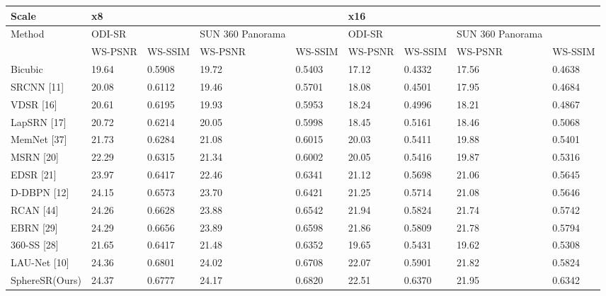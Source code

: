 \begin{tabular}{lllllllll}
\toprule
Scale & x8 &  &  &  & x16 &  &  &  \\
\midrule
Method & ODI-SR &  & SUN 360 Panorama &  & ODI-SR &  & SUN 360 Panorama &  \\
 & WS-PSNR & WS-SSIM & WS-PSNR & WS-SSIM & WS-PSNR & WS-SSIM & WS-PSNR & WS-SSIM \\
Bicubic & 19.64 & 0.5908 & 19.72 & 0.5403 & 17.12 & 0.4332 & 17.56 & 0.4638 \\
SRCNN [11] & 20.08 & 0.6112 & 19.46 & 0.5701 & 18.08 & 0.4501 & 17.95 & 0.4684 \\
VDSR [16] & 20.61 & 0.6195 & 19.93 & 0.5953 & 18.24 & 0.4996 & 18.21 & 0.4867 \\
LapSRN [17] & 20.72 & 0.6214 & 20.05 & 0.5998 & 18.45 & 0.5161 & 18.46 & 0.5068 \\
MemNet [37] & 21.73 & 0.6284 & 21.08 & 0.6015 & 20.03 & 0.5411 & 19.88 & 0.5401 \\
MSRN [20] & 22.29 & 0.6315 & 21.34 & 0.6002 & 20.05 & 0.5416 & 19.87 & 0.5316 \\
EDSR [21] & 23.97 & 0.6417 & 22.46 & 0.6341 & 21.12 & 0.5698 & 21.06 & 0.5645 \\
D-DBPN [12] & 24.15 & 0.6573 & 23.70 & 0.6421 & 21.25 & 0.5714 & 21.08 & 0.5646 \\
RCAN [44] & 24.26 & 0.6628 & 23.88 & 0.6542 & 21.94 & 0.5824 & 21.74 & 0.5742 \\
EBRN [29] & 24.29 & 0.6656 & 23.89 & 0.6598 & 21.86 & 0.5809 & 21.78 & 0.5794 \\
360-SS [28] & 21.65 & 0.6417 & 21.48 & 0.6352 & 19.65 & 0.5431 & 19.62 & 0.5308 \\
LAU-Net [10] & 24.36 & 0.6801 & 24.02 & 0.6708 & 22.07 & 0.5901 & 21.82 & 0.5824 \\
SphereSR(Ours) & 24.37 & 0.6777 & 24.17 & 0.6820 & 22.51 & 0.6370 & 21.95 & 0.6342 \\
\bottomrule
\end{tabular}
